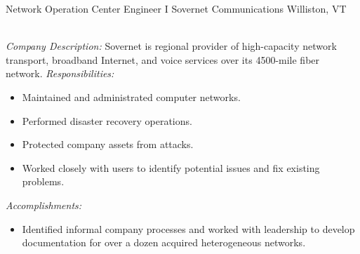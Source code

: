 \begin{samepage}
	{Network Operation Center Engineer I}
	{Sovernet Communications}
	{Williston, VT}{}
	{
		\emph{\\Company Description:}
		Sovernet is regional provider of high-capacity network transport,
		broadband Internet, and voice services over its 4500-mile fiber
		network.
		\newline{}
		\newline{}
		\emph{Responsibilities:}
		\begin{itemize}
			\item Maintained and administrated computer networks.
			\item Performed disaster recovery operations.
			\item Protected company assets from attacks.
			\item Worked closely with users to identify potential issues and fix existing problems.\\
		\end{itemize}
		\emph{Accomplishments:}
		\begin{itemize}
			\item
				Identified informal company processes and worked with leadership to
				develop documentation for over a dozen acquired heterogeneous
				networks.\\
		\end{itemize}
		}
\end{samepage}
